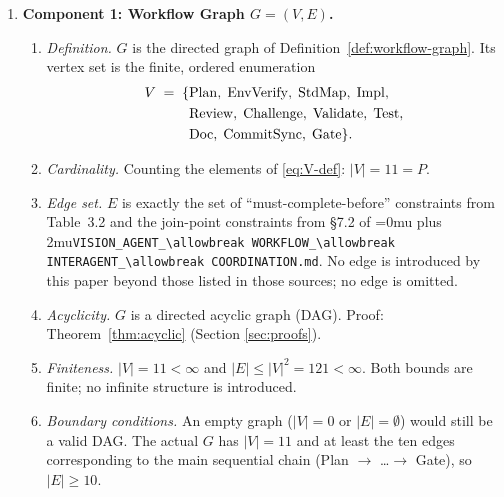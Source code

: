 \documentclass[12pt]{article}
\theoremstyle{definition}
\DeclareRobustCommand{\code}[1]{\begingroup\Urlmuskip=0mu plus 2mu\relax\nolinkurl{#1}\endgroup}
\newcommand{\VisionFlow}{\code{VISION\_AGENT\_\allowbreak WORKFLOW\_\allowbreak INTERAGENT\_\allowbreak COORDINATION.md}}
\begin{document}
\begin{enumerate}
  \item \textbf{Component 1: Workflow Graph $G = (V,E)$.}
  \begin{enumerate}
    \item[1.1] \emph{Definition.}
               $G$ is the directed graph of
               Definition~\ref{def:workflow-graph}.  Its vertex set
               is the finite, ordered enumeration
               \begin{align}
                 V \;=\;
                 \{&\mathrm{Plan},\;
                   \mathrm{EnvVerify},\;
                   \mathrm{StdMap},\;
                   \mathrm{Impl},\notag\\
                 &\mathrm{Review},\;
                   \mathrm{Challenge},\;
                   \mathrm{Validate},\;
                   \mathrm{Test},\notag\\
                 &\mathrm{Doc},\;
                   \mathrm{CommitSync},\;
                   \mathrm{Gate}\}. \label{eq:V-def}
               \end{align}
    \item[1.2] \emph{Cardinality.}
               Counting the elements of \eqref{eq:V-def}:
               $|V| = 11 = P$.
    \item[1.3] \emph{Edge set.}
               $E$ is exactly the set of ``must-complete-before''
               constraints from Table~3.2 and the join-point
               constraints from \S7.2 of \VisionFlow{}.
               No edge is introduced by this paper beyond those listed
               in those sources; no edge is omitted.
    \item[1.4] \emph{Acyclicity.}
               $G$ is a directed acyclic graph (DAG).
               Proof: Theorem~\ref{thm:acyclic} (Section
               \ref{sec:proofs}).
    \item[1.5] \emph{Finiteness.}
               $|V| = 11 < \infty$ and
               $|E| \leq |V|^2 = 121 < \infty$.
               Both bounds are finite; no infinite structure is
               introduced.
    \item[1.6] \emph{Boundary conditions.}
               An empty graph ($|V|=0$ or $|E|=\emptyset$) would
               still be a valid DAG.  The actual $G$ has $|V|=11$
               and at least the ten edges corresponding to the main
               sequential chain
               (Plan $\to$ \ldots $\to$ Gate), so $|E| \geq 10$.
  \end{enumerate}


\end{enumerate}
\end{document}
